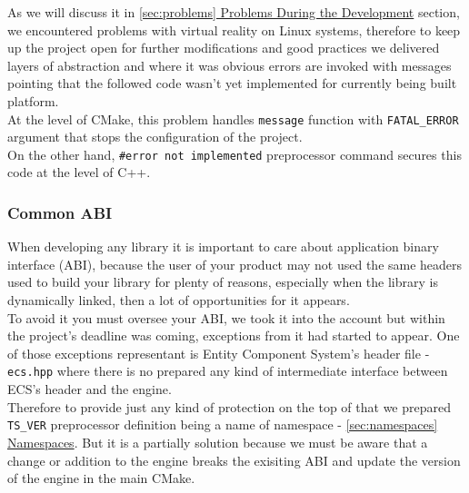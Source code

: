 As we will discuss it in \hyperref[sec:problems]{\ref{sec:problems} Problems During the Development} section, we encountered problems with virtual reality on Linux systems, therefore to keep up the project open for further modifications and good practices we delivered layers of abstraction and where it was obvious errors are invoked with messages pointing that the followed code wasn't yet implemented for currently being built platform.\\ At the level of CMake, this problem handles \texttt{message} function with \texttt{FATAL\_ERROR} argument that stops the configuration of the project.\\ On the other hand, \texttt{\#error not implemented} preprocessor command secures this code at the level of C++.

\subsubsection{Common ABI}
\label{sec:build_abi}
\hspace{\parindent} When developing any library it is important to care about application binary interface (ABI), because the user of your product may not used the same headers used to build your library for plenty of reasons, especially when the library is dynamically linked, then a lot of opportunities for it appears.\\To avoid it you must oversee your ABI, we took it into the account but within the project's deadline was coming, exceptions from it had started to appear. One of those exceptions representant is Entity Component System's header file - \texttt{ecs.hpp} where there is no prepared any kind of intermediate interface between ECS's header and the engine.\\Therefore to provide just any kind of protection on the top of that we prepared \texttt{TS\_VER} preprocessor definition being a name of namespace - \hyperref[sec:namespaces]{\ref*{sec:namespaces} Namespaces}. But it is a partially solution because we must be aware that a change or addition to the engine breaks the exisiting ABI and update the version of the engine in the main CMake. 

